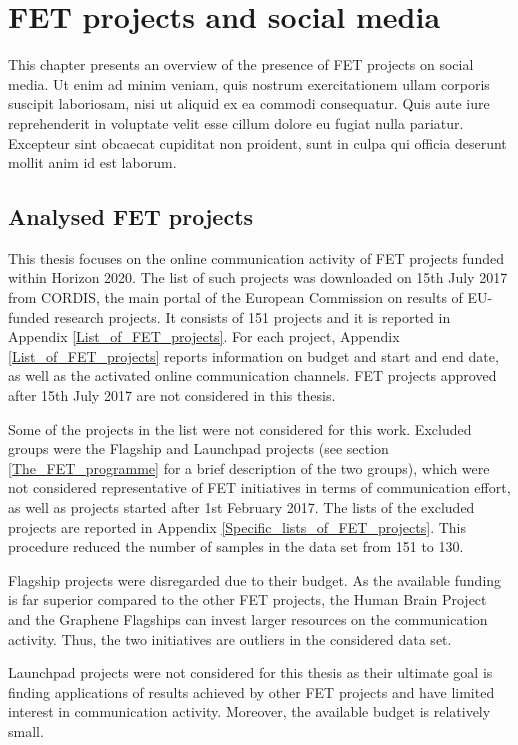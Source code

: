 \chapter{FET projects and social media}
This chapter presents an overview of the presence of FET projects on social media. Ut enim ad minim veniam, quis nostrum exercitationem ullam corporis suscipit laboriosam, nisi ut aliquid ex ea commodi consequatur. Quis aute iure reprehenderit in voluptate velit esse cillum dolore eu fugiat nulla pariatur. Excepteur sint obcaecat cupiditat non proident, sunt in culpa qui officia deserunt mollit anim id est laborum.

\section{Analysed FET projects} \label{Data_set}
This thesis focuses on the online communication activity of FET projects funded within Horizon 2020. The list of such projects was downloaded on 15th July 2017 from CORDIS, the main portal of the European Commission on results of EU-funded research projects. It consists of 151 projects and it is reported in Appendix \ref{List_of_FET_projects}. For each project, Appendix \ref{List_of_FET_projects} reports information on budget and start and end date, as well as the activated online communication channels. FET projects approved after 15th July 2017 are not considered in this thesis.  

Some of the projects in the list were not considered for this work. Excluded groups were the Flagship and Launchpad projects (see section \ref{The_FET_programme} for a brief description of the two groups), which were not considered representative of FET initiatives in terms of communication effort, as well as projects started after 1st February 2017. The lists of the excluded projects are reported in Appendix \ref{Specific_lists_of_FET_projects}. This procedure reduced the number of samples in the data set from 151 to 130.

Flagship projects were disregarded due to their budget.  As the available funding is far superior compared to the other FET projects, the Human Brain Project and the Graphene Flagships can invest larger resources on the communication activity. Thus, the two initiatives are outliers in the considered data set. 

Launchpad projects were not considered for this thesis as their ultimate goal is finding applications of results achieved by other FET projects and have limited interest in communication activity. Moreover, the available budget is relatively small. 

